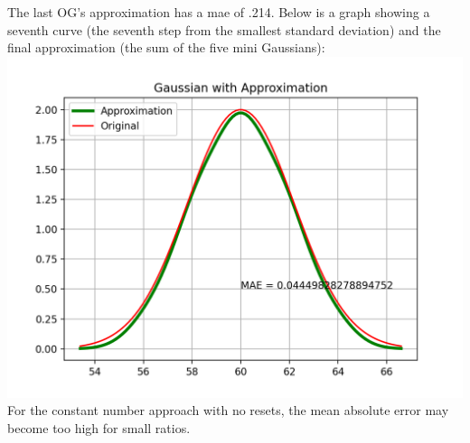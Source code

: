 \documentclass{article}
\begin{document}
The last OG's approximation has a mae of .214. Below is a graph showing a seventh curve (the seventh step from the smallest standard deviation) and the final approximation (the sum of the five mini Gaussians): \\
\includegraphics[scale = .8]{noreset_single.png} \\
For the constant number approach with no resets, the mean absolute error may become too high for small ratios. \\
\end{document}
